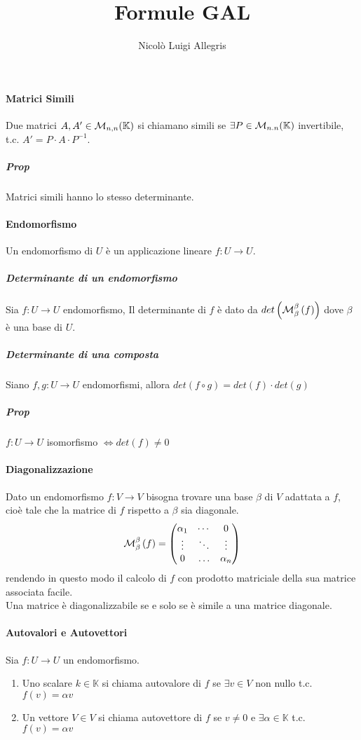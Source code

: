 \documentclass[a4paper,10pt]{article}
\title{Formule GAL}
\author{Nicolò Luigi Allegris}
\date{}
\begin{document}
\maketitle

\paragraph{Matrici Simili} Due matrici $A, A' \in {\cal{M}}_{n,n}(\mathbb{K})$
si chiamano simili se $\exists P \in {\cal{M}}_{n.n}(\mathbb{K})$ invertibile,
t.c. $A' = P \cdot A \cdot P^{-1}$.
\subparagraph{Prop} Matrici simili hanno lo stesso determinante.

\paragraph{Endomorfismo} Un endomorfismo di $U$ è un applicazione lineare $f: U
\rightarrow U$.

\subparagraph{Determinante di un endomorfismo} Sia $f: U \rightarrow U$
endomorfismo, Il determinante di $f$ è dato da
$det\left({\cal{M}}_{\beta}^{\beta}\left(f\right)\right)$ dove $\beta$ è una
base di $U$.

\subparagraph{Determinante di una composta} Siano $f,g: U \rightarrow U$
endomorfismi, allora $det\left(f \circ g \right) = det\left(f \right) \cdot
det\left(g \right)$

\subparagraph{Prop} $f: U \rightarrow U$ isomorfismo $\Leftrightarrow
det\left(f\right) \neq 0$

\paragraph{Diagonalizzazione} Dato un endomorfismo $f: V \rightarrow V$ bisogna
trovare una base $\beta$ di $V$ adattata a $f$, cioè tale che la matrice di $f$
rispetto a $\beta$ sia diagonale.
$${\cal M}_\beta^\beta\left(f\right) =
\begin{pmatrix}
\alpha_1 & \cdots & 0 \\
\vdots & \ddots & \vdots \\
0 & \ldots & \alpha_n
\end{pmatrix}$$
rendendo in questo modo il calcolo di $f$ con prodotto matriciale della sua
matrice associata facile. \\
Una matrice è diagonalizzabile se e solo se è simile a una matrice diagonale.

\paragraph{Autovalori e Autovettori} Sia $f: U \rightarrow U$ un endomorfismo.
\begin{enumerate}
  \item Uno scalare $k \in \mathbb{K}$ si chiama autovalore di $f$ se
$\exists v \in V$ non nullo t.c. $f\left(v\right) = \alpha v$
  \item Un vettore $V \in V$ si chiama autovettore di $f$ se
$v \neq 0$ e $\exists \alpha \in \mathbb{K}$ t.c. $f\left(v\right) = \alpha v$
\end{enumerate}
\end{document}
